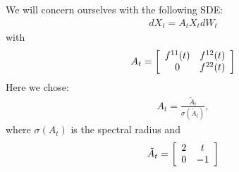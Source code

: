 We will concern ourselves with the following SDE:
\begin{align*}
	 dX_t = A_t X_t dW_t
\end{align*}
with
\begin{align*}
A_t=
\left[
\begin{array}[c]{cc}
f^{11}(t) & f^{12}(t)\\
0 & f^{22}(t)
\end{array}
\right]
\end{align*}
Here we chose:
\begin{align*}
A_t=\frac{\tilde{A}_t}{\sigma(\tilde{A}_t)},\end{align*}
where $\sigma(A_t)$ is the spectral radius and 
\begin{align*}
\tilde{A}_t=
\left[
\begin{array}[c]{cc}
2 & t\\
0 & -1
\end{array}
\right]
\end{align*}

